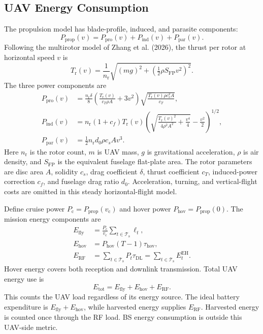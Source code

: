 \documentclass[conference]{IEEEtran}
\newcommand{\EH}{\mathrm{EH}}
\newcommand{\DL}{\mathrm{DL}}
\newcommand{\RF}{\mathrm{RF}}
\newcommand{\fly}{\mathrm{fly}}
\newcommand{\hov}{\mathrm{hov}}
\newcommand{\tot}{\mathrm{tot}}
\newcommand{\setT}{\mathcal{T}_{\mathrm{s}}}
\begin{document}
\subsection{UAV Energy Consumption}
The propulsion model has blade-profile, induced, and parasite components:
\begin{equation}
P_{\mathrm{prop}}(v)=P_{\mathrm{pro}}(v)
+P_{\mathrm{ind}}(v)+P_{\mathrm{par}}(v).
\label{eq:propulsion}
\end{equation}
Following the multirotor model of Zhang et al. (2026), the thrust per rotor at horizontal speed $v$ is
\begin{equation}
T_{\mathrm r}(v)=\frac{1}{n_{\mathrm r}}
\sqrt{(mg)^2+\left(\tfrac12\rho S_{\mathrm{FP}}v^2\right)^2}.
\label{eq:thrust}
\end{equation}
The three power components are
\begin{align}
P_{\mathrm{pro}}(v)&=\frac{n_{\mathrm r}\delta}{8}
\left(\frac{T_{\mathrm r}(v)}{c_T\rho A}+3v^2\right)
\sqrt{\frac{T_{\mathrm r}(v)\rho c_s^2 A}{c_T}},\label{eq:profile}\\
P_{\mathrm{ind}}(v)&=n_{\mathrm r}(1+c_f)T_{\mathrm r}(v)
\left(\sqrt{\frac{T_{\mathrm r}(v)^2}{4\rho^2A^2}
+\frac{v^4}{4}}-\frac{v^2}{2}\right)^{1/2},\label{eq:induced}\\
P_{\mathrm{par}}(v)&=\tfrac12n_{\mathrm r}d_0\rho c_sAv^3.
\label{eq:parasite}
\end{align}
Here $n_{\mathrm r}$ is the rotor count, $m$ is UAV mass, $g$ is gravitational acceleration, $\rho$ is air density, and $S_{\mathrm{FP}}$ is the equivalent fuselage flat-plate area. The rotor parameters are disc area $A$, solidity $c_s$, drag coefficient $\delta$, thrust coefficient $c_T$, induced-power correction $c_f$, and fuselage drag ratio $d_0$. Acceleration, turning, and vertical-flight costs are omitted in this steady horizontal-flight model.

Define cruise power $P_{\mathrm c}=P_{\mathrm{prop}}(v_{\mathrm c})$ and hover power $P_{\hov}=P_{\mathrm{prop}}(0)$. The mission energy components are
\begin{align}
E_{\fly}&=\frac{P_{\mathrm c}}{v_{\mathrm c}}\sum_{t\in\setT}\ell_t,
\label{eq:flight_energy}\\
E_{\hov}&=P_{\hov}(T-1)\tau_{\hov},\label{eq:hover_energy}\\
E_{\RF}&=\sum_{t\in\setT}P_t\tau_{\DL}
=\sum_{t\in\setT}E_t^{\EH}.\label{eq:rf_energy}
\end{align}
Hover energy covers both reception and downlink transmission. Total UAV energy use is
\begin{equation}
E_{\tot}=E_{\fly}+E_{\hov}+E_{\RF}.
\label{eq:total_energy}
\end{equation}
This counts the UAV load regardless of its energy source. The ideal battery expenditure is $E_{\fly}+E_{\hov}$, while harvested energy supplies $E_{\RF}$. Harvested energy is counted once through the RF load. BS energy consumption is outside this UAV-side metric.
\end{document}
